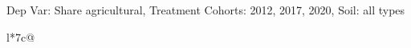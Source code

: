 \begin{table}[H]
\captionlistentry[table]{}
\label{table:beaver_land_class_DVis_land_class_1_SCg123_SSall_soil}
\scriptsize %
Dep Var: Share agricultural, Treatment Cohorts: 2012, 2017, 2020, Soil: all types \\
\begin{threeparttable}
\begin{tabulary}{\textwidth}{l*{7}{c}@{}}
\toprule \toprule
\noalign{\smallskip}
\noalign{\smallskip}
\midrule \bottomrule
\end{tabulary}
\medskip
\end{threeparttable}
\end{table}
